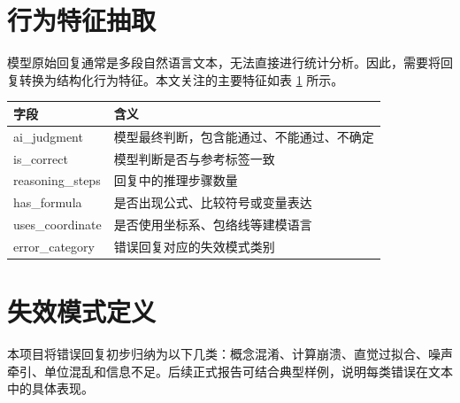 \section{行为特征抽取}

模型原始回复通常是多段自然语言文本，无法直接进行统计分析。因此，需要将回复转换为结构化行为特征。本文关注的主要特征如表 \ref{tab:features} 所示。

\begin{table}[htbp]
    \centering
    \begin{tabular}{ll}
        \toprule
        字段 & 含义 \\
        \midrule
        ai\_judgment & 模型最终判断，包含能通过、不能通过、不确定 \\
        is\_correct & 模型判断是否与参考标签一致 \\
        reasoning\_steps & 回复中的推理步骤数量 \\
        has\_formula & 是否出现公式、比较符号或变量表达 \\
        uses\_coordinate & 是否使用坐标系、包络线等建模语言 \\
        error\_category & 错误回复对应的失效模式类别 \\
        \bottomrule
    \end{tabular}
    \label{tab:features}
\end{table}

\section{失效模式定义}

本项目将错误回复初步归纳为以下几类：概念混淆、计算崩溃、直觉过拟合、噪声牵引、单位混乱和信息不足。后续正式报告可结合典型样例，说明每类错误在文本中的具体表现。
